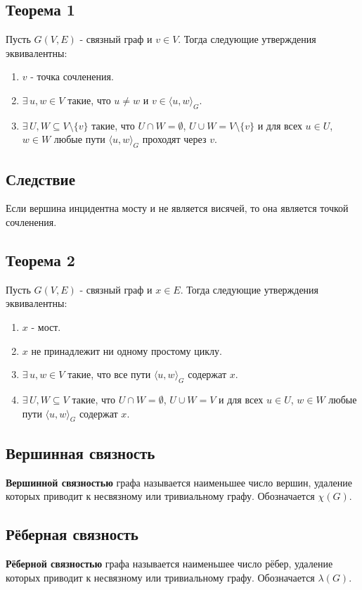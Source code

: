 {\subsection*{Теорема 1}
Пусть $G(V, E)$ - связный граф и $v \in V$. Тогда следующие утверждения эквивалентны:
\begin{enumerate}
  \item $v$ - точка сочленения.
  \item $\exists\, u, w \in V$ такие, что $u \ne w$ и $v \in \langle u, w \rangle_G$.
  \item $\exists\, U, W \subseteq V \setminus \{v\}$ такие, что $U \cap W = \emptyset$, $U \cup W = V \setminus \{v\}$ и для всех $u \in U$, $w \in W$ любые пути $\langle u, w \rangle_G$ проходят через $v$.
\end{enumerate}

\subsection*{Следствие}
Если вершина инцидентна мосту и не является висячей, то она является точкой сочленения.

\subsection*{Теорема 2}
Пусть $G(V, E)$ - связный граф и $x \in E$. Тогда следующие утверждения эквивалентны:
\begin{enumerate}
  \item $x$ - мост.
  \item $x$ не принадлежит ни одному простому циклу.
  \item $\exists\, u, w \in V$ такие, что все пути $\langle u, w \rangle_G$ содержат $x$.
  \item $\exists\, U, W \subseteq V$ такие, что $U \cap W = \emptyset$, $U \cup W = V$ и для всех $u \in U$, $w \in W$ любые пути $\langle u, w \rangle_G$ содержат $x$.
\end{enumerate}

\subsection*{Вершинная связность}
\textbf{Вершинной связностью} графа называется наименьшее число вершин, удаление которых приводит к несвязному или тривиальному графу. Обозначается $\chi(G)$.

\subsection*{Рёберная связность}
\textbf{Рёберной связностью} графа называется наименьшее число рёбер, удаление которых приводит к несвязному или тривиальному графу. Обозначается $\lambda(G)$.




    \newpage
}
